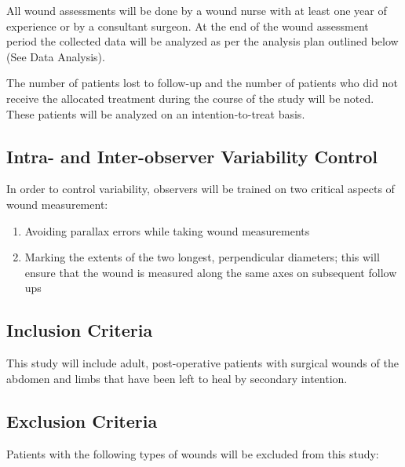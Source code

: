 \documentclass{article}
\begin{document}
All wound assessments will be done by a wound nurse with at least one year of
experience or by a consultant surgeon. At the end of the wound assessment period
the collected data will be analyzed as per the analysis plan outlined below (See
Data Analysis).

The number of patients lost to follow-up and the number of patients who did not
receive the allocated treatment during the course of the study will be noted.
These patients will be analyzed on an intention-to-treat basis.

\subsection{Intra- and Inter-observer Variability Control}
In order to control variability, observers will be trained on two critical
aspects of wound measurement:
\begin{enumerate}
\item Avoiding parallax errors while taking wound measurements
\item Marking the extents of the two longest, perpendicular diameters; this will ensure that the wound is measured along the same axes on subsequent follow ups
\end{enumerate}

\subsection{Inclusion Criteria}
This study will include adult, post-operative patients with surgical wounds of
the abdomen and limbs that have been left to heal by secondary intention.

\subsection{Exclusion Criteria}
Patients with the following types of wounds will be excluded from this study:
\end{document}
